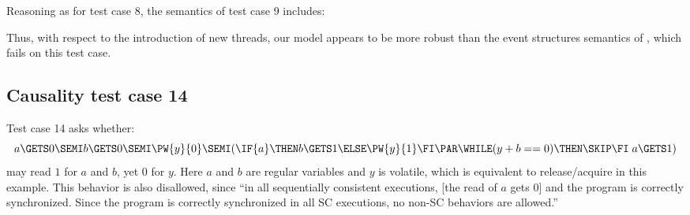 Reasoning as for test case 8, the semantics of test case 9 includes:
\begin{tikzdisplay}[node distance=1em]
\end{tikzdisplay}

Thus, with respect to the introduction of new threads, our model appears to
be more robust than the event structures semantics of
\cite{DBLP:conf/lics/JeffreyR16}, which fails on this test case.

\subsection{Causality test case 14}

Test case 14 asks whether:
\begin{displaymath}
   a\GETS 0\SEMI
   b\GETS 0\SEMI
   \PW{y}{0}\SEMI
  (\IF{a}\THEN b\GETS 1\ELSE \PW{y}{1}\FI 
  \PAR
  \WHILE(y+b==0) \THEN\SKIP\FI\; a\GETS1)
\end{displaymath}
may read $1$ for $a$ and $b$, yet $0$ for $y$.  Here $a$ and $b$ are regular
variables and $y$ is volatile, which is equivalent to release/acquire in this
example.  This behavior is also disallowed, since ``in all sequentially
consistent executions, [the read of $a$ gets $0$] and the program is
correctly synchronized. Since the program is correctly synchronized in all SC
executions, no non-SC behaviors are allowed.''


